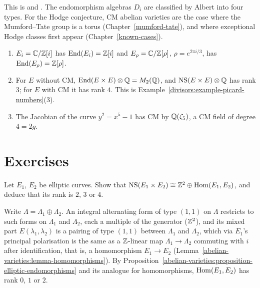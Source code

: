 This is \cite{birkenhake-lange} and \cite{mumford-abelian}. The endomorphism algebras $D_i$ are classified by
Albert into four types. For the Hodge conjecture, CM abelian varieties are the case where the Mumford--Tate group is a torus (Chapter~\ref{mumford-tate}), and where exceptional
Hodge classes first appear (Chapter~\ref{known-cases}).

\begin{example}\label{abelian-varieties:example-cm}
\begin{enumerate}
\item $E_i = \mathbb{C}/\mathbb{Z}[i]$ has $\operatorname{End}(E_i) = \mathbb{Z}[i]$ and $E_\rho = \mathbb{C}/\mathbb{Z}[\rho]$, $\rho = e^{2\pi i/3}$, has $\operatorname{End}(E_\rho) = \mathbb{Z}[\rho]$.
\item For $E$ without CM, $\operatorname{End}(E \times E) \otimes \mathbb{Q} = M_2(\mathbb{Q})$, and $\mathrm{NS}(E \times E) \otimes \mathbb{Q}$ has rank $3$; for $E$ with CM it has rank $4$. This is
Example~\ref{divisors:example-picard-numbers}(3).
\item The Jacobian of the curve $y^2 = x^5 - 1$ has CM by $\mathbb{Q}(\zeta_5)$, a CM field of degree $4 = 2g$.
\end{enumerate}
\end{example}

\section{Exercises}\label{abelian-varieties:section-exercises}

\begin{exercise}\label{abelian-varieties:exercise-ns-product}
Let $E_1$, $E_2$ be elliptic curves. Show that $\mathrm{NS}(E_1 \times E_2) \cong \mathbb{Z}^2 \oplus \operatorname{Hom}(E_1, E_2)$, and deduce that its rank is $2$, $3$ or $4$.
\end{exercise}

\begin{solution}
Write $\Lambda = \Lambda_1 \oplus \Lambda_2$. An integral alternating form of type $(1,1)$ on $\Lambda$ restricts to such forms on $\Lambda_1$ and $\Lambda_2$, each a multiple of the generator
($\mathbb{Z}^2$), and its mixed part $E(\lambda_1, \lambda_2)$ is a pairing of type $(1,1)$ between $\Lambda_1$ and $\Lambda_2$, which via $E_1$'s principal polarisation is the same as a
$\mathbb{Z}$-linear map $\Lambda_1 \to \Lambda_2$ commuting with $i$ after identification, that is, a homomorphism $E_1 \to E_2$ (Lemma~\ref{abelian-varieties:lemma-homomorphisms}). By
Proposition~\ref{abelian-varieties:proposition-elliptic-endomorphisms} and its analogue for homomorphisms, $\operatorname{Hom}(E_1, E_2)$ has rank $0$, $1$ or $2$.
\end{solution}

